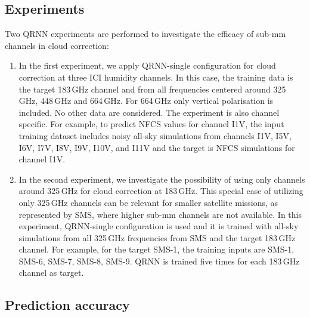 \documentclass[amt, manuscript]{copernicus}
\begin{document}
\subsection{Experiments}
%
Two QRNN experiments are performed to investigate the efficacy of sub-mm channels in cloud correction: 
\begin{enumerate}
	\item In the first experiment, we apply QRNN-single configuration for cloud correction at three ICI humidity channels. In this case, the training data is the target 183\,GHz channel and from all frequencies  centered around 325\,GHz, 448\,GHz and 664\,GHz. For 664\,GHz only vertical polarisation is included. No other data are considered. The experiment is also channel specific. For example, to predict NFCS values for channel I1V, the input training dataset includes noisy all-sky simulations from channels I1V, I5V, I6V, I7V, I8V, I9V, I10V, and I11V and the target is NFCS simulations for channel I1V.
	
	\item In the second experiment, we investigate the possibility of using only channels around 325\,GHz for cloud correction at 183\,GHz. This special case of utilizing only 325\,GHz channels can be relevant for smaller satellite missions, as represented by SMS, where higher sub-mm channels are not available. In this experiment, QRNN-single configuration is used and it is trained with all-sky simulations from all 325\,GHz frequencies from SMS and the target 183\,GHz channel. For example, for the target SMS-1, the training inputs are SMS-1, SMS-6, SMS-7, SMS-8, SMS-9. QRNN is trained five times for each 183\,GHz channel as target.
	
\end{enumerate}	

\subsection{Prediction accuracy}
\end{document}
